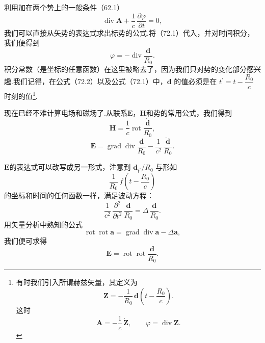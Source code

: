 利用加在两个势上的一般条件（62.1）
\begin{equation*}
  \operatorname{div}\boldsymbol{A}+\frac{1}{c}\,\frac{\partial\varphi}{\partial t}=0,
\end{equation*}
我们可以直接从矢势的表达式求出标势的公式.将（72.1）代入，并对时间积分，我们便得到
\begin{equation}
  \varphi=-\operatorname{div}\frac{\boldsymbol{d}}{R_0}.
\end{equation}
积分常数（是坐标的任意函数）在这里被略去了，因为我们只对势的变化部分感兴趣.我们记得，在公式（72.2）以及公式（72.1）中，$\boldsymbol{d}$ 的值必须是在 $t^{\prime}=t-\dfrac{R_0}{c}$ 时刻的值\footnote{有时我们引入所谓赫兹矢量，其定义为
\begin{equation*}
  \boldsymbol{Z}=-\frac{1}{R_0}\,\boldsymbol{d}\left(t-\frac{R_0}{c}\right).
\end{equation*}
这时
\begin{equation*}
  \boldsymbol{A}=-\frac{1}{c}\,\dot{\boldsymbol{Z}},\qquad
  \varphi=\operatorname{div}\boldsymbol{Z}.
\end{equation*}}.

现在已经不难计算电场和磁场了.从联系$\boldsymbol{E}$，$\boldsymbol{H}$和势的常用公式，我们得到
\begin{equation}
  \boldsymbol{H}=\frac{1}{c}\operatorname{rot}\frac{\dot{\boldsymbol{d}}}{R_0},
\end{equation}
\begin{equation}
  \boldsymbol{E}=\operatorname{grad}\operatorname{div}\frac{\boldsymbol{d}}{R_0}
  -\frac{1}{c^2}\,\frac{\ddot{\boldsymbol{d}}}{R_0}.
\end{equation}

$\boldsymbol{E}$的表达式可以改写成另一形式，注意到 $\boldsymbol{d}_{t^{\prime}}/R_0$ 与形如
\begin{equation*}
  \frac{1}{R_0}\,f\left(t-\frac{R_0}{c}\right)
\end{equation*}
的坐标和时间的任何函数一样，满足波动方程：
\begin{equation*}
  \frac{1}{c^2}\,\frac{\partial^2}{\partial t^2}\,\frac{\boldsymbol{d}}{R_0}=\Delta\,\frac{\boldsymbol{d}}{R_0}.
\end{equation*}
用矢量分析中熟知的公式
\begin{equation*}
  \operatorname{rot}\operatorname{rot}\boldsymbol{a}
  =\operatorname{grad}\operatorname{div}\boldsymbol{a}-\Delta\boldsymbol{a},
\end{equation*}
我们便可求得
\begin{equation}
  \boldsymbol{E}=\operatorname{rot}\operatorname{rot}\frac{\boldsymbol{d}}{R_0}.
\end{equation}

